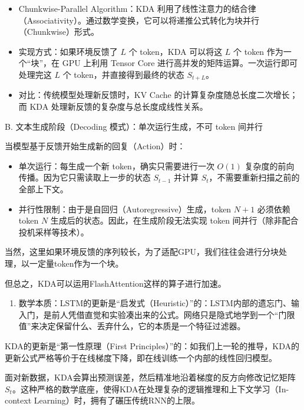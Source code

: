 \begin{itemize}
\tightlist
\item
  Chunkwise-Parallel Algorithm：KDA 利用了线性注意力的结合律（Associativity）。通过数学变换，它可以将递推公式转化为块并行（Chunkwise）形式。
\item
  实现方式：如果环境反馈了 \(L\) 个 token，KDA 可以将这 \(L\) 个 token 作为一个``块''，在 GPU 上利用 Tensor Core 进行高并发的矩阵运算。一次运行即可处理完这 \(L\) 个 token，并直接得到最终的状态 \(S_{t+L}\)。
\item
  对比：传统模型处理新反馈时，KV Cache 的计算复杂度随总长度二次增长；而 KDA 处理新反馈的复杂度与总长度成线性关系。
\end{itemize}

B. 文本生成阶段（Decoding 模式）：单次运行生成，不可 token 间并行

当模型基于反馈开始生成新的回复（Action）时：

\begin{itemize}
\tightlist
\item
  单次运行：每生成一个新 token，确实只需要进行一次 \(O(1)\) 复杂度的前向传播。因为它只需读取上一步的状态 \(S_{t-1}\) 并计算 \(S_t\)，不需要重新扫描之前的全部上下文。
\item
  并行性限制：由于是自回归（Autoregressive）生成，token \(N+1\) 必须依赖 token \(N\) 生成后的状态。因此，在生成阶段无法实现 token 间并行（除非配合投机采样等技术）。
\end{itemize}

当然，这里如果环境反馈的序列较长，为了适配GPU，我们往往会进行分块处理，以一定量token作为一个块。

但总之，KDA可以运用FlashAttention这样的算子进行加速。

\begin{enumerate}
\def\labelenumi{\arabic{enumi}.}
\setcounter{enumi}{2}
\tightlist
\item
  数学本质：LSTM的更新是``启发式（Heuristic）''的：LSTM内部的遗忘门、输入门，是前人凭借直觉和实验凑出来的公式。网络只是隐式地学到一个``门限值''来决定保留什么、丢弃什么，它的本质是一个特征过滤器。
\end{enumerate}

KDA的更新是``第一性原理（First Principles）''的：如我们上一轮的推导，KDA的更新公式严格等价于在线梯度下降，即在线训练一个内部的线性回归模型。

面对新数据，KDA会算出预测误差，然后精准地沿着梯度的反方向修改记忆矩阵 \(S_t\)。这种严格的数学底座，使得KDA在处理复杂的逻辑推理和上下文学习（In-context Learning）时，拥有了碾压传统RNN的上限。

